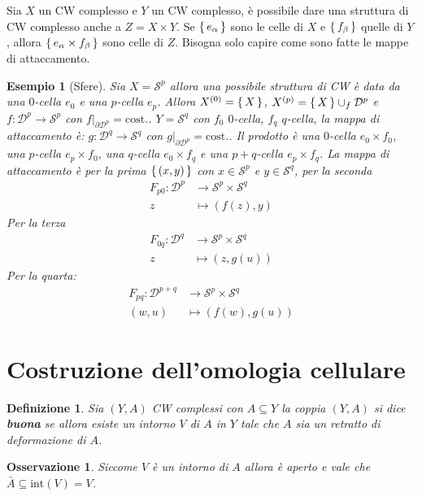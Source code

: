 \documentclass[10pt, twoside=false, x11names]{scrbook}
\newtheorem{osservation}[theorem]{Osservazione}
\newtheorem{definition}[theorem]{Definizione}
\newtheorem{example}[theorem]{Esempio}
\newcommand{\Sph}[1][]{\mathcal{S}^#1}
\newcommand{\Disk}[1][]{\mathcal{D}^#1}
\begin{document}
Sia $ X $ un CW complesso e $ Y $ un CW complesso, è
possibile dare una struttura di CW complesso anche a $ Z = X \times Y  $.
Se $ \set{e_\alpha} $ sono le celle di $ X $ e $ \set{f_\beta} $
quelle di $ Y $, allora $ \set{e_\alpha \times f_\beta} $ sono
celle di $ Z $. Bisogna solo capire come sono fatte le
mappe di attaccamento.

\begin{example}[Sfere]
  Sia $ X = \Sph{p} $ allora una possibile struttura di CW
  è data da una $ 0 $-cella $ e_0 $ e una $ p $-cella $ e_p $.
  Allora $ X^{(0)} = \set{X} $, $ X^{(p)} = \set{X} \cup_f \Disk{p} $
  e $ f \colon \Disk{p} \to \Sph{p} $ con $ f \big \vert_{\partial \Disk{p}} = \mathrm{cost.} $.
  $ Y = \Sph{q} $ con $ f_0 $ $ 0 $-cella, $ f_q $ $ q $-cella,
  la mappa di attaccamento è: $ g \colon \Disk{q} \to \Sph{q} $ con $ g \big \vert_{\partial \Disk{p}} = \mathrm{cost.} $.
  Il prodotto è una $ 0 $-cella $ e_0 \times f_0 $, una $ p $-cella
  $ e_p \times f_0 $, una $ q $-cella $ e_0 \times f_q $ e una $ p + q $-cella
  $ e_p \times f_q $. La mappa di attaccamento è per la prima
  $ \set{(x,y)} $ con $ x \in \Sph{p} $ e $ y \in \Sph{q} $,
  per la seconda
  \begin{align*}
    F_{p0} \colon \Disk{p} & \to \Sph{p} \times \Sph{q} \\
    z & \mapsto (f(z), y)
  \end{align*}
  Per la terza
  \begin{align*}
    F_{0q} \colon \Disk{q} & \to \Sph{p} \times \Sph{q} \\
    z & \mapsto (z, g(u))
  \end{align*}
  Per la quarta:
  \begin{align*}
    F_{pq} \colon \Disk{p+q} & \to \Sph{p} \times \Sph{q} \\
    (w,u) & \mapsto (f(w), g(u))
  \end{align*}
\end{example}




\section{Costruzione dell'omologia cellulare}

\begin{definition}
  Sia $ (Y,A) $ CW complessi con $ A \subseteq Y $
  la coppia $ (Y,A) $ si dice \textbf{buona} se
  allora esiste un intorno $ V $ di $ A $ in $ Y $ tale che $ A $
  sia un retratto di deformazione di $ A $.
\end{definition}
\begin{osservation}
  Siccome $ V $ è un intorno di $ A $ allora è aperto e vale
  che $ \bar{A} \subseteq \mathrm{int}(V) = V $.
\end{osservation}
\end{document}
